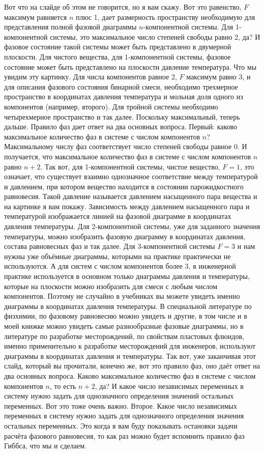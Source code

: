 \documentclass[main.tex]{subfiles}
\begin{document}
Вот что на слайде об этом не говорится, но я вам скажу.
Вот это равенство, $F$ максимум равняется $n$ плюс 1, дает размерность пространству необходимую для представления полной фазовой диаграммы $n$-компонентной системы.
Для 1-компонентной системы, это максимальное число степеней свободы равно 2, да?
И фазовое состояние такой системы может быть представлено
в двумерной плоскости.
Для чистого вещества, для 1-компонентной системы, фазовое состояние может быть представлено на плоскости давление температура.
Что мы увидим эту картинку.
Для числа компонентов равное 2, $F$ максимум равно 3, и для описания фазового состояния бинарной смеси, необходимо трехмерное пространство в координатах давления температура и мольная доля одного из компонентов (например, второго).
Для тройной системы необходимо четырехмерное пространство и так далее.
Поскольку максимальный, теперь дальше.
Правило фаз дает ответ на два основных вопроса.
Первый: каково максимальное количество фаз в системе с числом компонентов $n$?
Максимальному числу фаз соответствует число степеней свободы равное 0.
И получается, что максимальное количество фаз в системе с числом компонентов $n$ равно $n+2$.
Так вот, для 1-компонентной системы, чистое вещество, $F=1$, это означает, что существует взаимно однозначное соответствие между температурой и давлением, при котором вещество находится в состоянии парожидкостного равновесия.
Такой давление называется давлением насыщенного пара вещества и на картинке я вам покажу.
Зависимость между давлением насыщенного пара и температурой изображается линией на фазовой диаграмме в координатах давления температуры.
Для 2-компонентной системы, уже для заданного значения температуры, можно изобразить фазовую диаграмму в координатах давления, состава равновесных фаз и так далее.
Для 3-компонентной системы $F=3$ и нам нужны уже объёмные диаграммы, которыми на практике практически не используются.
А для систем с числом компонентов более 3, в инженерной практике
используется в основном только диаграммы давления и температуры, которые на плоскости можно изобразить для смеси с любым числом компонентов.
Поэтому не случайно в учебниках вы можете увидеть именно
диаграммы в координатах давления температуры.
В специальной литературе по физхимии, по фазовому равновесию можно увидеть и другие, в том числе и в моей книжке можно увидеть самые разнообразные фазовые диаграммы, но в литературе по разработке месторождений, по свойствам пластовых флюидов, именно применительно к разработке месторождений для инженеров, используют диаграммы в координатах давления и температуры.
Так вот, уже заканчивая этот слайд, который вы прочитали, конечно же, вот это правило фаз, оно даёт ответ на два основных вопроса.
Каково максимальное количество фаз в системе с числом компонентов $n$, то есть $n+2$, да?
И какое число независимых переменных в систему нужно задать для однозначного определения значений остальных переменных.
Вот это тоже очень важно.
Второе.
Какое число независимых переменных в систему нужно задать для однозначного определения значения остальных переменных.
Это когда я вам буду показывать остановки задачи расчёта фазового равновесия, то как раз можно будет вспомнить правило фаз Гиббса, что мы и сделаем.
\end{document}
